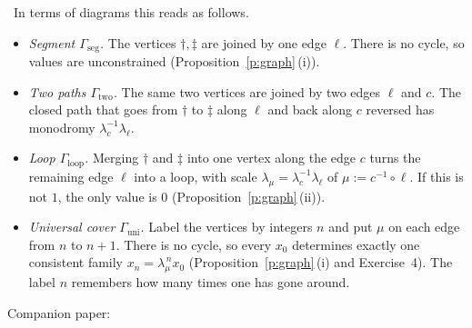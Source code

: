 \documentclass[11pt,a4paper]{article}
\newcommand{\Gseg}{\Gamma_{\mathrm{seg}}}
\newcommand{\Gtwo}{\Gamma_{\mathrm{two}}}
\newcommand{\Gloop}{\Gamma_{\mathrm{loop}}}
\newcommand{\Guni}{\Gamma_{\mathrm{uni}}}
\newcommand{\lab}[2]{{\upshape\fcolorbox{#1}{#1!8}{\scriptsize\sffamily\bfseries\textcolor{#1}{#2}}}}
\newcommand{\tagH}{\lab{BurntOrange}{H}}
\newcommand{\companion}[1]{\par{\footnotesize Companion paper: #1}\par}
\theoremstyle{plain}
\theoremstyle{definition}
\theoremstyle{remark}
\begin{document}
\begin{center}
\end{center}

\tagH\ In terms of diagrams this reads as follows.
\begin{itemize}
\item \emph{Segment $\Gseg$.} The vertices $\dagger,\ddagger$ are joined by one edge $\ell$. There is no cycle, so values
are unconstrained (Proposition~\ref{p:graph}\,(i)).
\item \emph{Two paths $\Gtwo$.} The same two vertices are joined by two edges $\ell$ and $c$. The closed path that goes
from $\dagger$ to $\ddagger$ along $\ell$ and back along $c$ reversed has monodromy $\lambda_c^{-1}\lambda_\ell$.
\item \emph{Loop $\Gloop$.} Merging $\dagger$ and $\ddagger$ into one vertex along the edge $c$ turns the remaining edge
$\ell$ into a loop, with scale $\lambda_\mu=\lambda_c^{-1}\lambda_\ell$ of $\mu:=c^{-1}\circ\ell$. If this is not $1$,
the only value is $0$ (Proposition~\ref{p:graph}\,(ii)).
\item \emph{Universal cover $\Guni$.} Label the vertices by integers $n$ and put $\mu$ on each edge from $n$ to $n+1$.
There is no cycle, so every $x_0$ determines exactly one consistent family $x_n=\lambda_\mu^{\,n}x_0$
(Proposition~\ref{p:graph}\,(i) and Exercise~4). The label $n$ remembers how many times one has gone around.
\end{itemize}
\companion{\cite[Props.~3.4--3.9]{Ur}}
\end{document}
